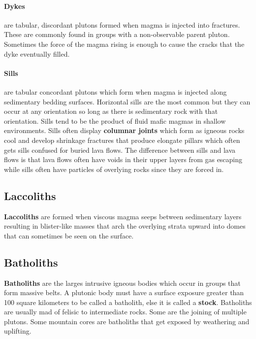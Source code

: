 \documentclass{article}
\begin{document}
\paragraph{Dykes} %
\label{par:dykes}
are tabular, discordant plutons formed when magma is injected into fractures. These are commonly found in groups with a non-observable parent pluton. Sometimes the force of the magma rising is enough to cause the cracks that the dyke eventually filled.
\paragraph{Sills} %
\label{par:sills}
are tabular concordant plutons which form when magma is injected along sedimentary bedding surfaces. Horizontal sills are the most common but they can occur at any orientation so long as there is sedimentary rock with that orientation. Sills tend to be the product of fluid mafic magmas in shallow environments. Sills often display \textbf{columnar joints} which form as igneous rocks cool and develop shrinkage fractures that produce elongate pillars which often gets sills confused for buried lava flows. The difference between sills and lava flows is that lava flows often have voids in their upper layers from gas escaping while sills often have particles of overlying rocks since they are forced in.


\subsection*{Laccoliths} %
\label{sub:laccoliths}
\textbf{Laccoliths} are formed when viscous magma seeps between sedimentary layers resulting in blister-like masses that arch the overlying strata upward into domes that can sometimes be seen on the surface.

\subsection*{Batholiths} %
\label{sub:batholiths}
\textbf{Batholiths} are the larges intrusive igneous bodies which occur in groups that form massive belts. A plutonic body must have a surface exposure greater than 100 square kilometers to be called a batholith, else it is called a \textbf{stock}. Batholiths are usually mad of felisic to intermediate rocks. Some are the joining of multiple plutons. Some mountain cores are batholiths that get exposed by weathering and uplifting.
\end{document}
